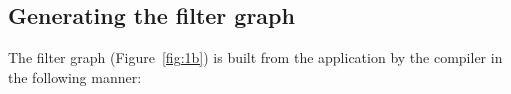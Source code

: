 \subsection{Generating the filter graph}
\label{sec:build-appl-graph}


The filter graph (Figure~\ref{fig:1b}) is built from the application by
the compiler %
in the following manner:


